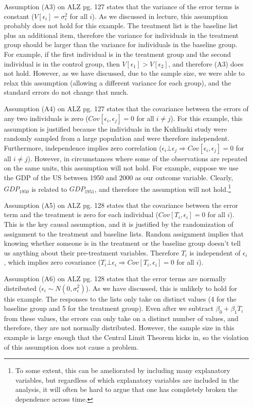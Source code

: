 \documentclass{article}
\begin{document}
Assumption (A3) on ALZ pg. 127 states that the variance of the error terms is constant ($V[\epsilon_i]=\sigma^2_{\epsilon}$ for all $i$). As we discussed in lecture, this assumption probably does not hold for this example. The treatment list is the baseline list plus an additional item, therefore the variance for individuals in the treatment group should be larger than the variance for individuals in the baseline group. For example, if the first individual is in the treatment group and the second individual is in the control group, then $V[\epsilon_1] > V[\epsilon_2]$, and therefore (A3) does not hold.  However, as we have discussed, due to the sample size, we were able to relax this assumption (allowing a different variance for each group), and the standard errors do not change that much. 

Assumption (A4) on ALZ pg. 127 states that the covariance between the errors of any two individuals is zero ($Cov[\epsilon_i,\epsilon_j]=0$ for all $i \ne j$). For this example, this assumption is justified because the individuals in the Kuklinski study were randomly sampled from a large population and were therefore independent.  Furthermore, independence implies zero correlation ($\epsilon_i \bot \epsilon_j \Rightarrow Cov[\epsilon_i,\epsilon_j]=0$ for all $i\ne j$). However, in circumstances where some of the observations are repeated on the same units, this assumption will not hold. For example, suppose we use the GDP of the US between 1950 and 2000 as our outcome variable. Clearly, $GDP_{1950}$ is related to $GDP_{1951}$, and therefore the assumption will not hold.\footnote{To some extent, this can be ameliorated by including many explanatory variables, but regardless of which explanatory variables are included in the analysis, it will often be hard to argue that one has completely broken the dependence across time.}

Assumption (A5) on ALZ pg. 128 states that the covariance between the error term and the treatment is zero for each individual ($Cov[T_i,\epsilon_i]=0$ for all $i$). This is the key causal assumption, and it is justified by the randomization of assignment to the treatment and baseline lists. Random assignment implies that knowing whether someone is in the treatment or the baseline group doesn't tell us anything about their pre-treatment variables. Therefore $T_i$ is independent of $\epsilon_i$, which implies zero covariance ($T_i \bot \epsilon_i \Rightarrow Cov[T_i,\epsilon_i]=0$ for all $i$).  

Assumption (A6) on ALZ pg. 128 states that the error terms are normally distributed ($\epsilon_i \sim N(0,\sigma^2_{\epsilon})$). As we have discussed, this is unlikely to hold for this example. The responses to the lists only take on distinct values (4 for the baseline group and 5 for the treatment group). Even after we subtract $\beta_0 + \beta_1T_i$ from these values, the errors can only take on a distinct number of values, and therefore, they are not normally distributed. However, the sample size in this example is large enough that the Central Limit Theorem kicks in, so the violation of this assumption does not cause a problem. 
\end{document}
